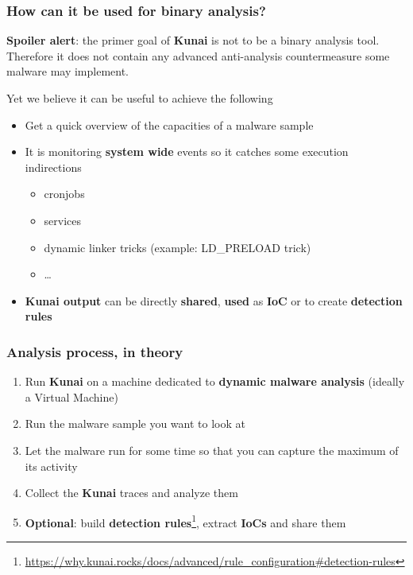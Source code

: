 \begin{frame}
	\frametitle{How can it be used for binary analysis?}

	\textbf{Spoiler alert}: the primer goal of \textbf{Kunai} is not to be a binary analysis tool. Therefore it does not contain any advanced anti-analysis countermeasure some malware may implement.

	\vspace{1em}
	\par
	Yet we believe it can be useful to achieve the following
	\begin{itemize}
		\item Get a quick overview of the capacities of a malware sample
		\item It is monitoring \textbf{system wide} events so it catches some execution indirections
		      \begin{itemize}
			      \item cronjobs
			      \item services
			      \item dynamic linker tricks (example: LD\_PRELOAD trick)
			      \item \ldots
		      \end{itemize}
		\item \textbf{Kunai output} can be directly \textbf{shared}, \textbf{used} as \textbf{IoC} or to create \textbf{detection rules}
	\end{itemize}
\end{frame}

\begin{frame}
	\frametitle{Analysis process, in theory}
	\begin{enumerate}
		\item Run \textbf{Kunai} on a machine dedicated to \textbf{dynamic malware analysis} (ideally a Virtual Machine)
		\item Run the malware sample you want to look at
		\item Let the malware run for some time so that you can capture the maximum of its activity
		\item Collect the \textbf{Kunai} traces and analyze them
		\item \textbf{Optional}: build \textbf{detection rules}\footnote{\url{https://why.kunai.rocks/docs/advanced/rule_configuration#detection-rules}}, extract \textbf{IoCs} and share them
	\end{enumerate}
\end{frame}

